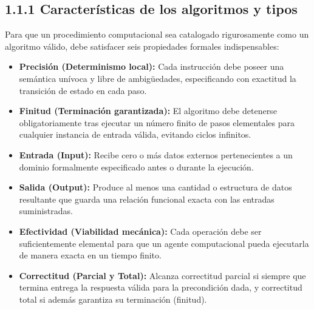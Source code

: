 \documentclass[11pt,letterpaper]{article}
\begin{document}
\subsection*{1.1.1 Características de los algoritmos y tipos}
Para que un procedimiento computacional sea catalogado rigurosamente como un algoritmo válido, debe satisfacer seis propiedades formales indispensables:\par
\begin{itemize}
\setlength{\itemsep}{2pt}\setlength{\parskip}{0pt}
  \item \textbf{Precisión (Determinismo local): }Cada instrucción debe poseer una semántica unívoca y libre de ambigüedades, especificando con exactitud la transición de estado en cada paso.
  \item \textbf{Finitud (Terminación garantizada): }El algoritmo debe detenerse obligatoriamente tras ejecutar un número finito de pasos elementales para cualquier instancia de entrada válida, evitando ciclos infinitos.
  \item \textbf{Entrada (Input): }Recibe cero o más datos externos pertenecientes a un dominio formalmente especificado antes o durante la ejecución.
  \item \textbf{Salida (Output): }Produce al menos una cantidad o estructura de datos resultante que guarda una relación funcional exacta con las entradas suministradas.
  \item \textbf{Efectividad (Viabilidad mecánica): }Cada operación debe ser suficientemente elemental para que un agente computacional pueda ejecutarla de manera exacta en un tiempo finito.
  \item \textbf{Correctitud (Parcial y Total): }Alcanza correctitud parcial si siempre que termina entrega la respuesta válida para la precondición dada, y correctitud total si además garantiza su terminación (finitud).
\end{itemize}
\end{document}
